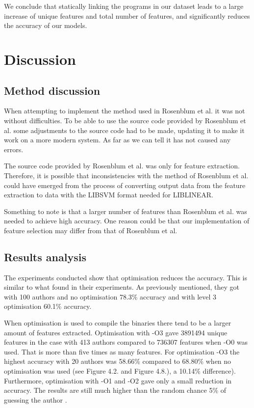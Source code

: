 \documentclass[a4paper,11pt]{kth-mag}
\begin{document}
We conclude that statically linking the programs in our dataset leads to a
large increase of unique features and total number of features, and
significantly reduces the accuracy of our models.

\chapter{Discussion}
\section{Method discussion}
When attempting to implement the method used in Rosenblum et al. it was not
without difficulties. To be able to use the source code provided by Rosenblum
et al. some adjustments to the source code had to be made, updating it to make
it work on a more modern system. As far as we can tell it has not caused any
errors.

The source code provided by Rosenblum et al. was only for feature extraction.
Therefore, it is possible that inconsistencies with the method of Rosenblum et al. could have
emerged from the process of converting output data from the feature extraction to
data with the LIBSVM format needed for LIBLINEAR.

Something to note is that a larger number of features than Rosenblum et al. was needed to achieve high
accuracy. One reason could be that our implementation of feature selection may differ from that of
Rosenblum et al. 

\section{Results analysis}
The experiments conducted show that optimisation reduces the accuracy. This is
similar to what \parencite{caliskan2015coding} found in their experiments. As
previously mentioned, they got with 100 authors and no optimisation 78.3\%
accuracy and with level 3 optimisation 60.1\% accuracy.

When optimisation is used to compile the binaries there tend to be a larger
amount of features extracted. Optimisation with -O3 gave 3891494 unique
features in the case with 413 authors compared to 736307 features when -O0 was
used. That is more than five times as many features. For optimisation -O3  the
highest accuracy with 20 authors was 58.66\% compared to 68.80\% when no
optimisation was used (see Figure 4.2. and Figure 4.8.), a 10.14\% difference).
Furthermore, optimisation with -O1 and -O2 gave only a small reduction in
accuracy. The results are still much higher than the random chance 5\% of
guessing the author . 
\end{document}
